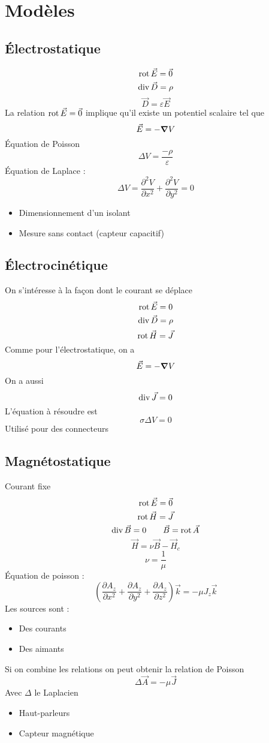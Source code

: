 \documentclass[resume]{subfiles}
\begin{document}
\section{Modèles}
\subsection{Électrostatique}
$$\operatorname{rot}\vec{E}=\vec{0}$$
$$\operatorname{div}\vec{D}=\rho$$
$$\vec{D}=\varepsilon\vec{E}$$
La relation $\operatorname{rot}\vec{E}=\vec{0}$ implique qu'il existe un potentiel scalaire tel que
$$\vec{E}=-\grad V$$
Équation de Poisson
$$\Delta V=\frac{-\rho}{\varepsilon}$$
Équation de Laplace :
$$\Delta V=\frac{\partial^2V}{\partial x^2}+\frac{\partial^2 V}{\partial y^2}=0$$
\begin{itemize}
\item Dimensionnement d'un isolant
\item Mesure sans contact (capteur capacitif)
\end{itemize}

\subsection{Électrocinétique}
On s'intéresse à la façon dont le courant se déplace
$$\operatorname{rot}\vec{E}=0$$
$$\operatorname{div}\vec{D}=\rho$$
$$\operatorname{rot}\vec{H}=\vec{J}$$
Comme pour l'électrostatique, on a
$$\vec{E}=-\grad V$$
On a aussi
$$\operatorname{div}\vec{J}=0$$
L'équation à résoudre est
$$\sigma \Delta V=0$$
Utilisé pour des connecteurs
\subsection{Magnétostatique}
Courant fixe
$$\operatorname{rot}\vec{E}=\vec{0}$$
$$\operatorname{rot}\vec{H}=\vec{J}$$
$$\operatorname{div}\vec{B}=0\qquad \vec{B}=\operatorname{rot}\vec{A}$$
$$\vec{H}=\nu\vec{B}-\vec{H}_c$$
$$\nu=\frac{1}{\mu}$$
Équation de poisson :
$$\left(\frac{\partial A_z}{\partial x^2}+\frac{\partial A_z}{\partial y^2}+\frac{\partial A_z}{\partial z^2}\right)\vec{k}=-\mu J_z\vec{k}$$
Les sources sont :
\begin{itemize}
\item Des courants
\item Des aimants
\end{itemize}
Si on combine les relations on peut obtenir la relation de Poisson
$$\Delta \vec{A}=-\mu \vec{J}$$
Avec $\Delta$ le Laplacien
\begin{itemize}
\item Haut-parleurs
\item Capteur magnétique
\end{itemize}
\end{document}
